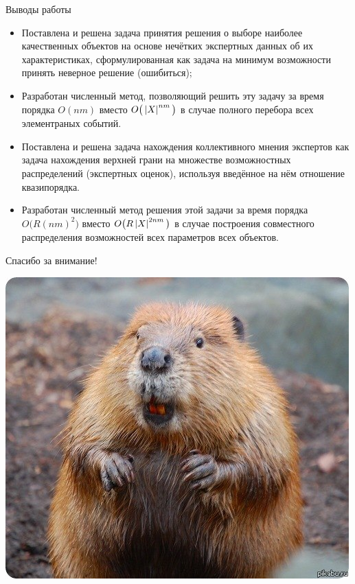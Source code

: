 
\begin{frame}{Выводы работы}
	\begin{itemize}
	 \item 
	 Поставлена и решена задача принятия решения о выборе наиболее качественных объектов на основе нечётких экспертных данных об их характеристиках, сформулированная как задача на минимум возможности принять неверное 
	 решение (ошибиться);	
	\item 
	Разработан численный метод, позволяющий решить эту задачу за время порядка $O(nm)$ вместо $O\big(\left| X \right|^{nm}\big)$ в случае полного перебора всех элементраных событий. %
	\item
	Поставлена и решена задача нахождения коллективного мнения экспертов как задача нахождения верхней грани на множестве возможностных распределений (экспертных оценок), используя введённое на нём отношение квазипорядка.
	\item
	Разработан численный метод решения этой задачи за время порядка $O\big(R(nm)^2\big)$ вместо $O\big(R\left| X \right|^{2nm}\big)$ в случае построения совместного распределения возможностей всех параметров всех объектов. %
      \end{itemize}
\end{frame} %

		

\appendix

\begin{frame}{Спасибо за внимание!}
	\begin{center}
		\includegraphics[width=0.5\linewidth]{./pic/biber_final}
	\end{center}
\end{frame}

